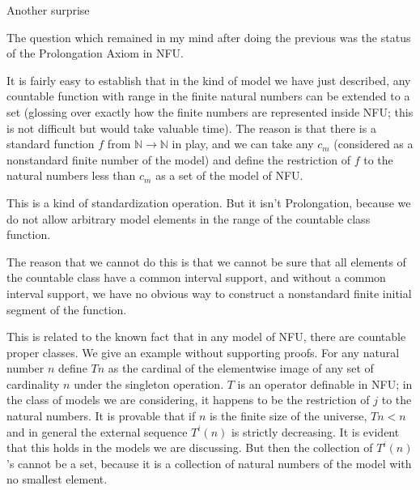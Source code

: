 \documentclass{slides}
\begin{document}
\begin{slide}

{\Large Another surprise}

The question which remained in my mind after doing the previous was the status of the Prolongation Axiom in NFU.

It is fairly easy to establish that in the kind of model we have just described, any countable function with range in the finite natural numbers can be extended to a set (glossing over exactly how the finite numbers are represented inside NFU;  this is not difficult but would take valuable time).  The reason is that there is a standard function $f$  from $\mathbb N \rightarrow \mathbb N$ in play, and we can take any $c_m$ (considered as a nonstandard finite number of the model) and define the restriction of $f$ to the natural numbers less than $c_m$ as a set of the model of NFU.

\end{slide}

\begin{slide}

This is a kind of standardization operation.  But it isn't Prolongation, because we do not allow arbitrary model elements in the range of the countable class function.

The reason that we cannot do this is that we cannot be sure that all elements of the countable class have a common interval support, and without a common interval support, we have no obvious way to construct a nonstandard finite initial segment of the function.

\end{slide}

\begin{slide}

This is related to the known fact that in any model of NFU, there are countable proper classes.  We give an example without supporting proofs.  For any natural number $n$ define $Tn$ as the cardinal of the elementwise image of any set of cardinality $n$ under the singleton operation.  $T$ is an operator definable in NFU;  in the class of models we are considering, it happens to be the restriction of $j$ to the natural numbers.  It is provable that if $n$ is the finite size of the universe, $Tn<n$ and in general the external sequence $T^i(n)$ is strictly decreasing.  It is evident that this holds in the models we are discussing.   But then the collection of $T^i(n)$'s cannot be a set, because it is a collection of natural numbers of the model with no smallest element.

\end{slide}
\end{document}
